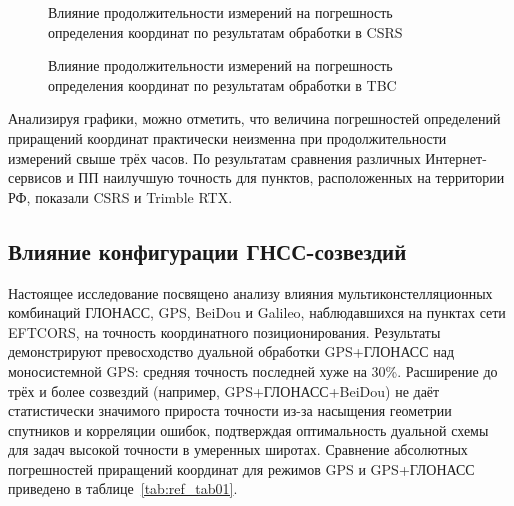 \begin{figure}[h]
	\vspace{-7mm} %
	\centerfloat{\scalebox{0.71}{
		
	}}
	\caption{Влияние продолжительности измерений на погрешность \\определения координат по результатам обработки в CSRS}\label{fig:ref_pic01}
	\vspace{-7mm} %
\end{figure}
\begin{figure}[h]
	\vspace{-7mm} %
	\centerfloat{\scalebox{0.71}{
		
	}}
	\caption{Влияние продолжительности измерений на погрешность \\определения координат по результатам обработки в TBC}\label{fig:ref_pic02}
	\vspace{-7mm} %
\end{figure}

Анализируя графики, можно отметить, что величина погрешностей определений приращений координат практически неизменна при продолжительности измерений свыше трёх часов. 
По результатам сравнения различных Интернет-сервисов и ПП наилучшую точность для пунктов, расположенных на территории РФ, показали CSRS и Trimble RTX.


\subsection*{Влияние конфигурации ГНСС-созвездий}


Настоящее исследование посвящено анализу влияния мультиконстелляционных комбинаций ГЛОНАСС, GPS, BeiDou и Galileo, наблюдавшихся на пунктах сети EFTCORS, на точность координатного позиционирования. Результаты демонстрируют превосходство дуальной обработки GPS+ГЛОНАСС над моносистемной GPS: средняя точность последней хуже на 30\%. Расширение до трёх и более созвездий (например, GPS+ГЛОНАСС+BeiDou) не даёт статистически значимого прироста точности из-за насыщения геометрии спутников и корреляции ошибок, подтверждая оптимальность дуальной схемы для задач высокой точности в умеренных широтах. Сравнение абсолютных погрешностей приращений координат для режимов GPS и GPS+ГЛОНАСС приведено в таблице~\cref{tab:ref_tab01}.



